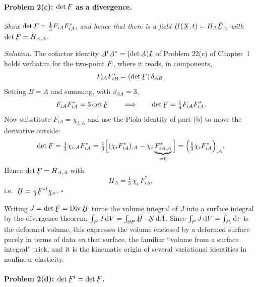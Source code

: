 %
\paragraph*{Problem 2(c): $\det\bF$ as a divergence.}
\emph{Show} $\det\bF=\tfrac13F_{iA}F^{*}_{iA}$, \emph{and hence that there is
a field $\vek{H}(\bX,t)=H_A\hbE_A$ with} $\det\bF=H_{A,A}$.

\emph{Solution.} The cofactor identity $\bA^{t}\bA^{*}=(\det\bA)\I$ of
Problem 22(c) of Chapter~1 holds verbatim for the two-point $\bF$, where it
reads, in components,
\[
   F_{iA}F^{*}_{iB}=(\det\bF)\,\dd_{AB}.
\]
Setting $B=A$ and summing, with $\dd_{AA}=3$,
\[
   F_{iA}F^{*}_{iA}=3\det\bF
   \qquad\Longrightarrow\qquad \det\bF=\tfrac13F_{iA}F^{*}_{iA}.
\]
Now substitute $F_{iA}=\chi_{i,A}$ and use the Piola identity of part (b) to
move the derivative outside:
\[
   \det\bF=\tfrac13\chi_{i,A}F^{*}_{iA}
   =\tfrac13\Big[(\chi_iF^{*}_{iA})_{,A}-\chi_i\underbrace{F^{*}_{iA,A}}_{=0}\Big]
   =\Big(\tfrac13\chi_iF^{*}_{iA}\Big)_{,A}.
\]
Hence $\det\bF=H_{A,A}$ with
\[
   H_A=\tfrac13\,\chi_i\,F^{*}_{iA},
\]
i.e.\ $\vek{H}=\tfrac13\bF^{*t}\bchi_\kappa$. \hfill$\square$

\begin{remark}\label{rem:Hdiv}
Writing $J=\det\bF=\Dvg\vek{H}$ turns the volume integral of $J$ into a
surface integral by the divergence theorem,
$\int_P J\,\dl V=\int_{\partial P}\ip{\vek{H}}{\bN}\,\dl A$. Since
$\int_PJ\,\mathrm{d} V=\int_{P_t}\mathrm{d} v$ is the deformed volume, this expresses the
volume enclosed by a deformed surface purely in terms of data \emph{on} that
surface, the familiar ``volume from a surface integral'' trick, and it is the
kinematic origin of several variational identities in nonlinear elasticity.
\end{remark}

%
\paragraph*{Problem 2(d): $\det\bF^{t}=\det\bF$.}

